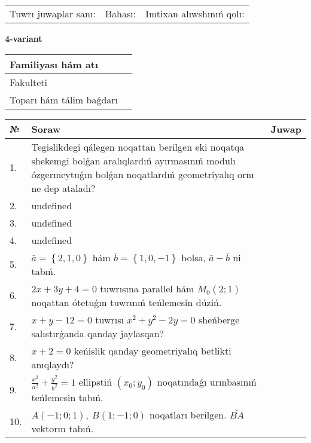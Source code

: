 \documentclass{article}
\begin{document}
\vspace{0.7cm}

\begin{tabular}{lll}
Tuwrı juwaplar sanı: \underline{\hspace{1cm}} & 
Bahası: \underline{\hspace{1cm}} & 
Imtixan alıwshınıń qolı: \underline{\hspace{2cm}} \\
\end{tabular}

\egroup

\newpage


\textbf{4-variant}\\

\bgroup
\def\arraystretch{1.6} %

\begin{tabular}{|m{5.7cm}|m{9.5cm}|}
\hline
Familiyası hám atı & \\
\hline
Fakulteti  & \\
\hline
Toparı hám tálim baǵdarı  & \\
\hline
\end{tabular}

\vspace{0.7cm}

\begin{tabular}{|m{0.7cm}|m{10cm}|m{4cm}|}
\hline
№ & Soraw & Juwap \\
\hline
1. & Tegislikdegi qálegen noqattan berilgen eki noqatqa shekemgi bolǵan aralıqlardıń ayırmasınıń modulı ózgermeytuǵın bolǵan noqatlardıń geometriyalıq ornı ne dep ataladı? &  \\
\hline
2. & undefined &  \\
\hline
3. & undefined &  \\
\hline
4. & undefined &  \\
\hline
5. & \(\bar{a} = \left\{ 2, 1, 0 \right\}\) hám \(\bar{b} = \left\{ 1, 0,- 1 \right\}\) bolsa, \(\bar{a} - \bar{b}\) ni tabıń. &  \\
\hline
6. & \(2 x + 3 y + 4 = 0\) tuwrısına parallel hám \(M_{0} (2;1)\) noqattan ótetuǵın tuwrınıń teńlemesin dúziń. &  \\
\hline
7. & \(x + y - 12 = 0\) tuwrısı \(x^{2} + y^{2} - 2 y = 0\) sheńberge salıstırǵanda qanday jaylasqan? &  \\
\hline
8. & \(x + 2 = 0\) keńislik qanday geometriyalıq betlikti anıqlaydı? &  \\
\hline
9. & \(\frac{x^{2}}{a^{2}} + \frac{y^{2}}{b^{2}} = 1\) ellipstiń \((x_{0};y_{0})\) noqatındaǵı urınbasınıń teńlemesin tabıń. &  \\
\hline
10. & \(A (- 1;0;1),\ B (1; - 1;0)\) noqatları berilgen. \(\bar{BA}\) vektorın tabıń. & \\
\hline
\end{tabular}
\end{document}
